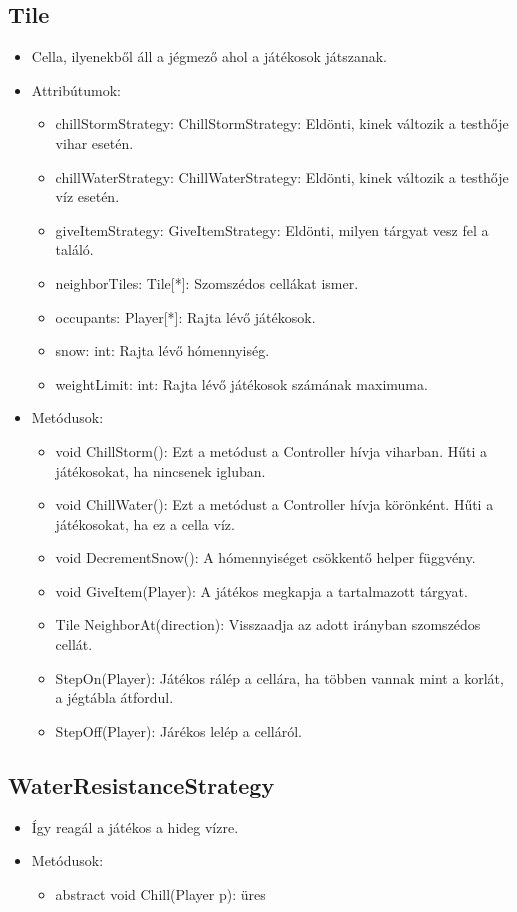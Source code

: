 \subsection{Tile}
\begin{itemize}
	\item Cella, ilyenekből áll a jégmező ahol a játékosok játszanak.
\item Attribútumok:
\begin{itemize}
	\item chillStormStrategy: ChillStormStrategy: Eldönti, kinek változik a testhője vihar esetén.
	\item chillWaterStrategy: ChillWaterStrategy: Eldönti, kinek változik a testhője víz esetén.
	\item giveItemStrategy: GiveItemStrategy: Eldönti, milyen tárgyat vesz fel a találó.
	\item neighborTiles: Tile[*]: Szomszédos cellákat ismer.
	\item occupants: Player[*]: Rajta lévő játékosok.
	\item snow: int: Rajta lévő hómennyiség.
	\item weightLimit: int: Rajta lévő játékosok számának maximuma.
	
\end{itemize}
\item Metódusok:
\begin{itemize}
	\item void ChillStorm(): Ezt a metódust a Controller hívja viharban. Hűti a játékosokat, ha nincsenek igluban.
	\item void ChillWater(): Ezt a metódust a Controller hívja körönként. Hűti a játékosokat, ha ez a cella víz.
	\item void DecrementSnow(): A hómennyiséget csökkentő helper függvény.
	\item void GiveItem(Player): A játékos megkapja a tartalmazott tárgyat.
	\item Tile NeighborAt(direction): Visszaadja az adott irányban szomszédos cellát.
	\item StepOn(Player): Játékos rálép a cellára, ha többen vannak mint a korlát, a jégtábla átfordul.
	\item StepOff(Player): Járékos lelép a celláról.
\end{itemize}
\end{itemize}

\subsection{WaterResistanceStrategy}
\begin{itemize}
	\item Így reagál a játékos a hideg vízre.
\item Metódusok:
\begin{itemize}
	\item abstract void Chill(Player p): üres
\end{itemize}
\end{itemize}

